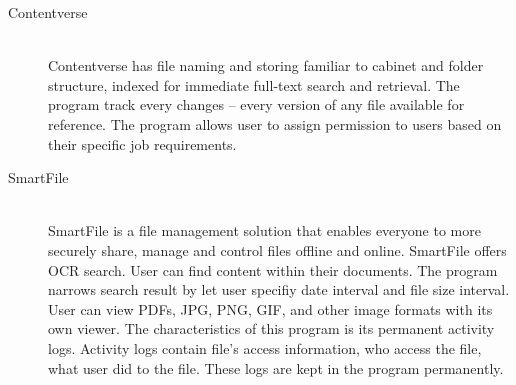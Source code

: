 \begin{description}
\item[Contentverse] \hfill \\
Contentverse has file naming and storing familiar to cabinet and folder structure, indexed for immediate full-text search and retrieval.
The program track every changes -- every version of any file available for reference.
The program allows user to assign permission to users based on their specific job requirements.

\item[SmartFile] \hfill \\
SmartFile is a file management solution that enables everyone to more securely share, manage and control files offline and online.
SmartFile offers \gls{OCR} search.
User can find content within their documents.
The program narrows search result by let user specifiy date interval and file size interval.
User can view PDFs, JPG, PNG, GIF, and other image formats with its own viewer.
The characteristics of this program is its permanent activity logs.
Activity logs contain file's access information, who access the file, what user did to the file.
These logs are kept in the program permanently.


\end{description}